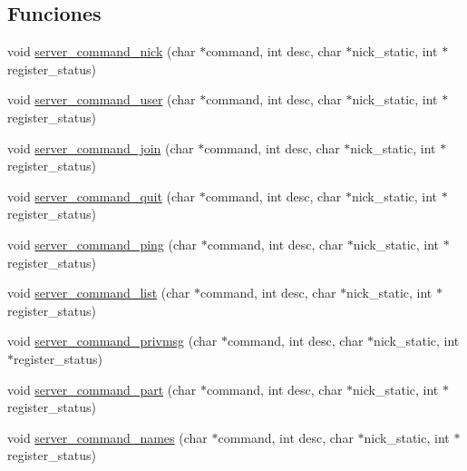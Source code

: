 \subsection*{Funciones}
\begin{DoxyCompactItemize}
\item 
void \hyperlink{G-2313-06-P1__function__handlers_8c_aeefab469ba48ce1655dd5afd14f104b4}{server\+\_\+command\+\_\+nick} (char $\ast$command, int desc, char $\ast$nick\+\_\+static, int $\ast$register\+\_\+status)
\item 
void \hyperlink{G-2313-06-P1__function__handlers_8c_ad09156d6bd4cf58f4345e0bf851ff099}{server\+\_\+command\+\_\+user} (char $\ast$command, int desc, char $\ast$nick\+\_\+static, int $\ast$register\+\_\+status)
\item 
void \hyperlink{G-2313-06-P1__function__handlers_8c_a375c143c5469d1bb4fa7793b310ad68e}{server\+\_\+command\+\_\+join} (char $\ast$command, int desc, char $\ast$nick\+\_\+static, int $\ast$register\+\_\+status)
\item 
void \hyperlink{G-2313-06-P1__function__handlers_8c_a3df99a1f2cefc2d91d65cbb6dd555f96}{server\+\_\+command\+\_\+quit} (char $\ast$command, int desc, char $\ast$nick\+\_\+static, int $\ast$register\+\_\+status)
\item 
void \hyperlink{G-2313-06-P1__function__handlers_8c_acc1c181bf44087b9216d1b59809937aa}{server\+\_\+command\+\_\+ping} (char $\ast$command, int desc, char $\ast$nick\+\_\+static, int $\ast$register\+\_\+status)
\item 
void \hyperlink{G-2313-06-P1__function__handlers_8c_af289e3cc397e24e9b8c12c35bce68285}{server\+\_\+command\+\_\+list} (char $\ast$command, int desc, char $\ast$nick\+\_\+static, int $\ast$register\+\_\+status)
\item 
void \hyperlink{G-2313-06-P1__function__handlers_8c_a8daf68135f2d9e9412c04a2980bdfb2f}{server\+\_\+command\+\_\+privmsg} (char $\ast$command, int desc, char $\ast$nick\+\_\+static, int $\ast$register\+\_\+status)
\item 
void \hyperlink{G-2313-06-P1__function__handlers_8c_aba1a3da1fb58bb35076e7ea56037463e}{server\+\_\+command\+\_\+part} (char $\ast$command, int desc, char $\ast$nick\+\_\+static, int $\ast$register\+\_\+status)
\item 
void \hyperlink{G-2313-06-P1__function__handlers_8c_a0fe05d80af27ae220f8fa631468606ea}{server\+\_\+command\+\_\+names} (char $\ast$command, int desc, char $\ast$nick\+\_\+static, int $\ast$register\+\_\+status)
\item 

\end{DoxyCompactItemize}
